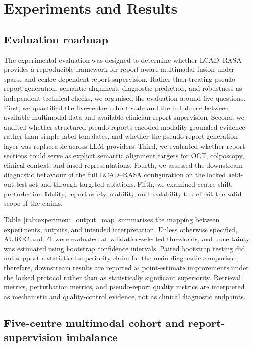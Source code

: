 \section{Experiments and Results}
\label{sec:experiments_results}

\subsection{Evaluation roadmap}
\label{subsec:evaluation_roadmap}

The experimental evaluation was designed to determine whether LCAD--RASA provides a reproducible framework for report-aware multimodal fusion under sparse and centre-dependent report supervision. Rather than treating pseudo-report generation, semantic alignment, diagnostic prediction, and robustness as independent technical checks, we organised the evaluation around five questions. First, we quantified the five-centre cohort scale and the imbalance between available multimodal data and available clinician-report supervision. Second, we audited whether structured pseudo reports encoded modality-grounded evidence rather than simple label templates, and whether the pseudo-report generation layer was replaceable across LLM providers. Third, we evaluated whether report sections could serve as explicit semantic alignment targets for OCT, colposcopy, clinical-context, and fused representations. Fourth, we assessed the downstream diagnostic behaviour of the full LCAD--RASA configuration on the locked held-out test set and through targeted ablations. Fifth, we examined centre shift, perturbation fidelity, report safety, stability, and scalability to delimit the valid scope of the claims.

Table~\ref{tab:experiment_output_map} summarises the mapping between experiments, outputs, and intended interpretation. Unless otherwise specified, AUROC and F1 were evaluated at validation-selected thresholds, and uncertainty was estimated using bootstrap confidence intervals. Paired bootstrap testing did not support a statistical superiority claim for the main diagnostic comparison; therefore, downstream results are reported as point-estimate improvements under the locked protocol rather than as statistically significant superiority. Retrieval metrics, perturbation metrics, and pseudo-report quality metrics are interpreted as mechanistic and quality-control evidence, not as clinical diagnostic endpoints.

\subsection{Five-centre multimodal cohort and report-supervision imbalance}
\label{subsec:cohort_supervision_results}

